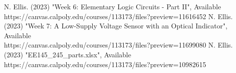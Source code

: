 \documentclass[conference]{IEEEtran}
\begin{document}
\begin{thebibliography}{00}
 N. Ellis. (2023) "Week 6: Elementary Logic Circuits - Part II", Available https://canvas.calpoly.edu/courses/113173/files?preview=11616452
 N. Ellis. (2023) "Week 7: A Low-Supply Voltage Sensor with an Optical Indicator", Available \\https://canvas.calpoly.edu/courses/113173/files?preview=11699080
 N. Ellis. (2023) "EE145\_245\_parts.xlsx", Available \\ https://canvas.calpoly.edu/courses/113173/files?preview=10982615
\end{thebibliography}
\vspace{12pt}
\end{document}

